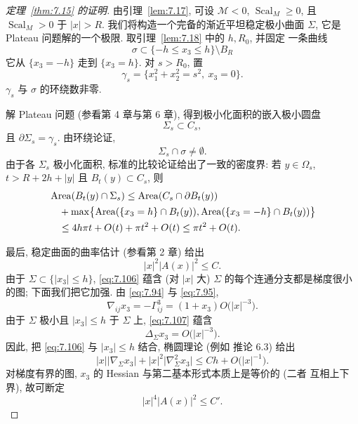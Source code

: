 \begin{proof}[定理~\ref{thm:7.15} 的证明]
由引理~\ref{lem:7.17}, 可设 $\mathcal{M}<0$,
$\operatorname{Scal}_M\geq0$, 且 $\operatorname{Scal}_M>0$ 于
$|x|>R$. 我们将构造一个完备的渐近平坦稳定极小曲面 $\Sigma$, 它是
Plateau 问题解的一个极限. 取引理~\ref{lem:7.18} 中的 $h,R_0$, 并固定
一条曲线
\begin{equation}
\sigma\subset\{-h\leq x_3\leq h\}\setminus B_R
\label{eq:7.102}
\end{equation}
它从 $\{x_3=-h\}$ 走到 $\{x_3=h\}$. 对 $s>R_0$, 置
\begin{equation}
\gamma_s=\bigl\{x_1^2+x_2^2=s^2,\ x_3=0\bigr\}.
\label{eq:7.103}
\end{equation}
$\gamma_s$ 与 $\sigma$ 的环绕数非零.

解 Plateau 问题 (参看第 4 章与第 6 章), 得到极小化面积的嵌入极小圆盘
\begin{equation}
\Sigma_s\subset C_s,
\label{eq:7.104}
\end{equation}
且 $\partial\Sigma_s=\gamma_s$. 由环绕论证,
\[
\Sigma_s\cap\sigma\neq\emptyset.
\]
由于各 $\Sigma_s$ 极小化面积, 标准的比较论证给出了一致的密度界: 若
$y\in\Omega_s$, $t>R+2h+|y|$ 且 $B_t(y)\subset C_s$, 则
\begin{equation}
\begin{aligned}
&\operatorname{Area}(B_t(y)\cap\Sigma_s)\leq\operatorname{Area}(C_s\cap\partial B_t(y))\\
&\quad+\max\bigl\{\operatorname{Area}(\{x_3=h\}\cap B_t(y)),
\operatorname{Area}(\{x_3=-h\}\cap B_t(y))\bigr\}\\
&\quad\leq4h\pi t+O(t)+\pi t^2+O(t)\leq\pi t^2+O(t).
\end{aligned}
\label{eq:7.105}
\end{equation}

最后, 稳定曲面的曲率估计 (参看第 2 章) 给出
\begin{equation}
|x|^2|A(x)|^2\leq C.
\label{eq:7.106}
\end{equation}
由于 $\Sigma\subset\{|x_3|\leq h\}$, \eqref{eq:7.106} 蕴含 (对 $|x|$
大) $\Sigma$ 的每个连通分支都是梯度很小的图; 下面我们把它加强. 由
\eqref{eq:7.94} 与 \eqref{eq:7.95},
\begin{equation}
\nabla_{ij}x_3=-\Gamma_{ij}^3=(1+x_3)O\bigl(|x|^{-3}\bigr).
\label{eq:7.107}
\end{equation}
由于 $\Sigma$ 极小且 $|x_3|\leq h$ 于 $\Sigma$ 上, \eqref{eq:7.107} 蕴含
\begin{equation}
\Delta_{\Sigma}x_3=O\bigl(|x|^{-3}\bigr).
\label{eq:7.108}
\end{equation}
因此, 把 \eqref{eq:7.106} 与 $|x_3|\leq h$ 结合, 椭圆理论 (例如
\cite{GiTr} 推论 6.3) 给出
\begin{equation}
|x|\bigl|\nabla_{\Sigma}x_3\bigr|
+|x|^2\bigl|\nabla_{\Sigma}^2x_3\bigr|
\leq Ch+O\bigl(|x|^{-1}\bigr).
\label{eq:7.109}
\end{equation}
对梯度有界的图, $x_3$ 的 Hessian 与第二基本形式本质上是等价的 (二者
互相上下界), 故可断定
\begin{equation}
|x|^4|A(x)|^2\leq C'.
\label{eq:7.110}
\end{equation}


\end{proof}
